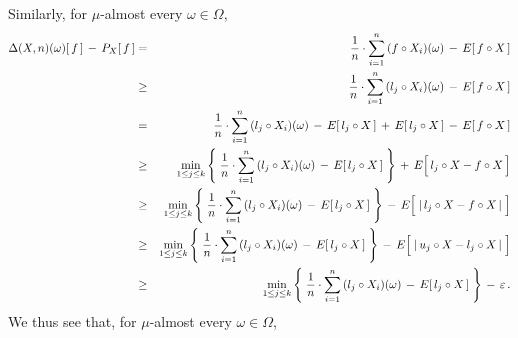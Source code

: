 Similarly, for $\mu$-almost every $\omega\in\Omega$,
\begin{eqnarray*}
\Delta(X,n)(\omega)[\,f\,]\,\overset{{\color{white}+}}{-}\,P_{X}[\,f\,]
& = &
	\dfrac{1}{n}\cdot \overset{n}{\underset{i=1}{\sum}}\,(f \circ X_{i})(\omega)
	\,\overset{{\color{white}+}}{-}\,
	E[\,f \circ X\,]
\\
& \geq &
	\dfrac{1}{n}\cdot \overset{n}{\underset{i=1}{\sum}}\,(l_{j} \circ X_{i})(\omega)
	\,\overset{{\color{white}+}}{-}\,
	E[\,f \circ X\,]
\\
& = &
	\dfrac{1}{n}\cdot \overset{n}{\underset{i=1}{\sum}}\,(l_{j} \circ X_{i})(\omega)
	\,\overset{{\color{white}+}}{-}\,
	E[\,l_{j} \circ X\,]
	\,\overset{{\color{white}+}}{+}\,
	E[\,l_{j} \circ X\,]
	\,\overset{{\color{white}+}}{-}\,
	E[\,f \circ X\,]
\\
& \geq &
	\underset{1\leq j \leq k}{\min}\left\{\;
		\dfrac{1}{n}\cdot \overset{n}{\underset{i=1}{\sum}}\,(l_{j} \circ X_{i})(\omega)
		\,\overset{{\color{white}+}}{-}\,
		E[\,l_{j} \circ X\,]
		\;\right\}
	\,\overset{{\color{white}+}}{+}\,
	E\!\left[\, l_{j} \circ X \overset{{\color{white}.}}{-} f \circ X\,\right]
\\
& \geq &
	\underset{1\leq j \leq k}{\min}\left\{\;
		\dfrac{1}{n}\cdot \overset{n}{\underset{i=1}{\sum}}\,(l_{j} \circ X_{i})(\omega)
		\,\overset{{\color{white}+}}{-}\,
		E[\,l_{j} \circ X\,]
		\;\right\}
	\,\overset{{\color{white}+}}{-}\,
	E\!\left[\; \vert\, l_{j} \circ X \overset{{\color{white}.}}{-} f \circ X \,\vert \;\right]
\\
& \geq &
	\underset{1\leq j \leq k}{\min}\left\{\;
		\dfrac{1}{n}\cdot \overset{n}{\underset{i=1}{\sum}}\,(l_{j} \circ X_{i})(\omega)
		\,\overset{{\color{white}+}}{-}\,
		E[\,l_{j} \circ X\,]
		\;\right\}
	\,\overset{{\color{white}+}}{-}\,
	E\!\left[\; \vert\, u_{j} \circ X \overset{{\color{white}.}}{-} l_{j} \circ X \,\vert \;\right]
\\
& \geq &
	\underset{1\leq j \leq k}{\min}\left\{\;
		\dfrac{1}{n}\cdot \overset{n}{\underset{i=1}{\sum}}\,(l_{j} \circ X_{i})(\omega)
		\,\overset{{\color{white}+}}{-}\,
		E[\,l_{j} \circ X\,]
		\;\right\}
	\,\overset{{\color{white}+}}{-}\,
	\varepsilon\,.
\end{eqnarray*}
We thus see that, for $\mu$-almost every $\omega \in \Omega$,

